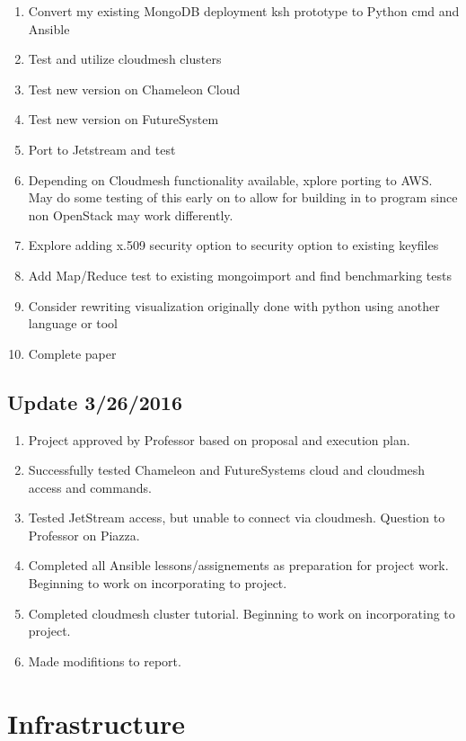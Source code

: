 \documentclass[9pt,twocolumn,twoside]{../../styles/osajnl}
\begin{document}
\begin{enumerate}
\item Convert my existing MongoDB deployment ksh prototype to Python cmd and Ansible
\item Test and utilize cloudmesh clusters
\item Test new version on Chameleon Cloud
\item Test new version on FutureSystem
\item Port to Jetstream and test
\item Depending on Cloudmesh functionality available, xplore porting to AWS.  May do some testing of this early on to allow for building in to program since non OpenStack may work differently.
\item Explore adding x.509 security option to security option to existing keyfiles
\item Add Map/Reduce test to existing mongoimport and find benchmarking tests
\item Consider rewriting visualization originally done with python using another language or tool
\item Complete paper

\end{enumerate}

\subsection{Update 3/26/2016}

\begin{enumerate}
\item Project approved by Professor based on proposal and execution plan.
\item Successfully tested Chameleon and FutureSystems cloud and cloudmesh access and commands.
\item Tested JetStream access, but unable to connect via cloudmesh.  Question to Professor on Piazza.
\item Completed all Ansible lessons/assignements as preparation for project work.  Beginning to work on incorporating to project.
\item Completed cloudmesh cluster tutorial.  Beginning to work on incorporating to project.
\item Made modifitions to report.
\end{enumerate}


\section{Infrastructure}
\end{document}

